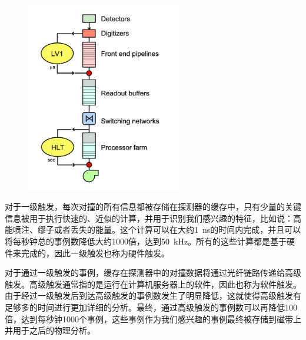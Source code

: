 \begin{figure}[!htbp]
    \centering
    \includegraphics[width=0.6\textwidth]{figures/chapter02/trigger.png}
    \label{fig:c02f13}
\end{figure}

对于一级触发，每次对撞的所有信息都被存储在探测器的缓存中，只有少量的关键信息被用于执行快速的、近似的计算，并用于识别我们感兴趣的特征，比如说：高能喷注、缪子或者丢失的能量。这个计算可以在大约1~\si{ns}的时间内完成，并且可以将每秒钟总的事例数降低大约1000倍，达到50~\si{kHz}。所有的这些计算都是基于硬件来完成的，因此一级触发也称为硬件触发。

对于通过一级触发的事例，缓存在探测器中的对撞数据将通过光纤链路传递给高级触发。高级触发通常指的是运行在计算机服务器上的软件，因此也称为软件触发。由于经过一级触发后到达高级触发的事例数发生了明显降低，这就使得高级触发有足够多的时间进行更加详细的分析。最终，通过高级触发的事例数可以再降低100倍，达到每秒钟1000个事例，这些事例作为我们感兴趣的事例最终被存储到磁带上并用于之后的物理分析。